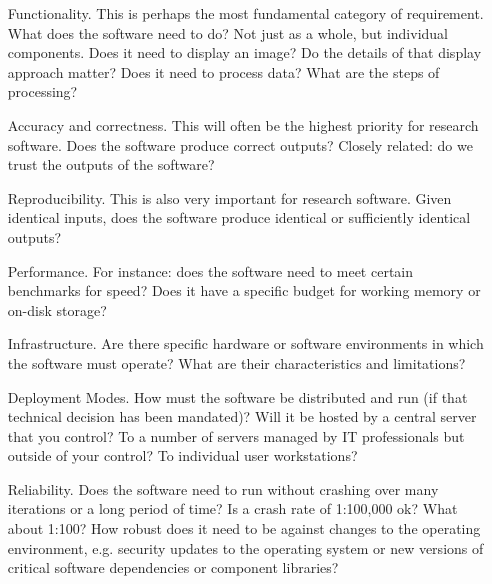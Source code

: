\documentclass[12pt,oneside]{book}
\begin{document}
\begin{itemize}[wide, labelwidth=!, labelindent=0pt, font=\bfseries]
\item[Functionality.] This is perhaps the most fundamental category of requirement. What does the software need to do? Not just as a whole, but individual components. Does it need to display an image? Do the details of that display approach matter? Does it need to process data? What are the steps of processing?

\item[Accuracy and correctness.] This will often be the highest priority for research software. Does the software produce correct outputs? Closely related: do we trust the outputs of the software?
	
\item[Reproducibility.] This is also very important for research software. Given identical inputs, does the software produce identical or sufficiently identical outputs?
	
\item[Performance.] For instance: does the software need to meet certain benchmarks for speed? Does it have a specific budget for working memory or on-disk storage?

\item[Infrastructure.] Are there specific hardware or software environments in which the software must operate? What are their characteristics and limitations?
	
\item[Deployment Modes.] How must the software be distributed and run (if that technical decision has been mandated)? Will it be hosted by a central server that you control? To a number of servers managed by IT professionals but outside of your control? To individual user workstations?

\item[Reliability.] Does the software need to run without crashing over many iterations or a long period of time? Is a crash rate of 1:100,000 ok? What about 1:100? How robust does it need to be against changes to the operating environment, e.g. security updates to the operating system or new versions of critical software dependencies or component libraries?


\end{itemize}
\end{document}
